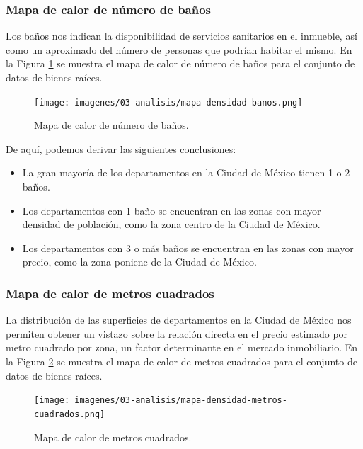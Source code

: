 \subsubsection{Mapa de calor de número de baños}

Los baños nos indican la disponibilidad de servicios sanitarios en el inmueble,
así como un aproximado del número de personas que podrían habitar el mismo. En
la Figura \ref{fig:mapa_calor_banos} se muestra el mapa de calor de número de
baños para el conjunto de datos de bienes raíces.

\begin{figure}[H]
  \centering
  \texttt{[image: imagenes/03-analisis/mapa-densidad-banos.png]}
  \caption{Mapa de calor de número de baños.}
  \label{fig:mapa_calor_banos}
\end{figure}

De aquí, podemos derivar las siguientes conclusiones:

\begin{itemize}
  \item La gran mayoría de los departamentos en la Ciudad de México tienen 1 o
  2 baños.
  \item Los departamentos con 1 baño se encuentran en las zonas con mayor
  densidad de población, como la zona centro de la Ciudad de México.
  \item Los departamentos con 3 o más baños se encuentran en las zonas con
  mayor precio, como la zona poniene de la Ciudad de México.
\end{itemize}

\subsubsection{Mapa de calor de metros cuadrados}

La distribución de las superficies de departamentos en la Ciudad de México nos
permiten obtener un vistazo sobre la relación directa en el precio estimado
por metro cuadrado por zona, un factor determinante en el mercado inmobiliario.
En la Figura \ref{fig:mapa_calor_metros_cuadrados} se muestra el mapa de calor
de metros cuadrados para el conjunto de datos de bienes raíces.

\begin{figure}[H]
  \centering
  \texttt{[image: imagenes/03-analisis/mapa-densidad-metros-cuadrados.png]}
  \caption{Mapa de calor de metros cuadrados.}
  \label{fig:mapa_calor_metros_cuadrados}
\end{figure}

